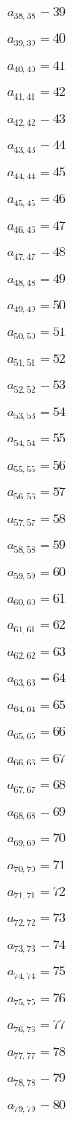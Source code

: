\documentclass[a4paper,12pt]{article}
\begin{document}
$a _{ 38, 38 } = 39$

$a _{ 39, 39 } = 40$

$a _{ 40, 40 } = 41$

$a _{ 41, 41 } = 42$

$a _{ 42, 42 } = 43$

$a _{ 43, 43 } = 44$

$a _{ 44, 44 } = 45$

$a _{ 45, 45 } = 46$

$a _{ 46, 46 } = 47$

$a _{ 47, 47 } = 48$

$a _{ 48, 48 } = 49$

$a _{ 49, 49 } = 50$

$a _{ 50, 50 } = 51$

$a _{ 51, 51 } = 52$

$a _{ 52, 52 } = 53$

$a _{ 53, 53 } = 54$

$a _{ 54, 54 } = 55$

$a _{ 55, 55 } = 56$

$a _{ 56, 56 } = 57$

$a _{ 57, 57 } = 58$

$a _{ 58, 58 } = 59$

$a _{ 59, 59 } = 60$

$a _{ 60, 60 } = 61$

$a _{ 61, 61 } = 62$

$a _{ 62, 62 } = 63$

$a _{ 63, 63 } = 64$

$a _{ 64, 64 } = 65$

$a _{ 65, 65 } = 66$

$a _{ 66, 66 } = 67$

$a _{ 67, 67 } = 68$

$a _{ 68, 68 } = 69$

$a _{ 69, 69 } = 70$

$a _{ 70, 70 } = 71$

$a _{ 71, 71 } = 72$

$a _{ 72, 72 } = 73$

$a _{ 73, 73 } = 74$

$a _{ 74, 74 } = 75$

$a _{ 75, 75 } = 76$

$a _{ 76, 76 } = 77$

$a _{ 77, 77 } = 78$

$a _{ 78, 78 } = 79$

$a _{ 79, 79 } = 80$
\end{document}
